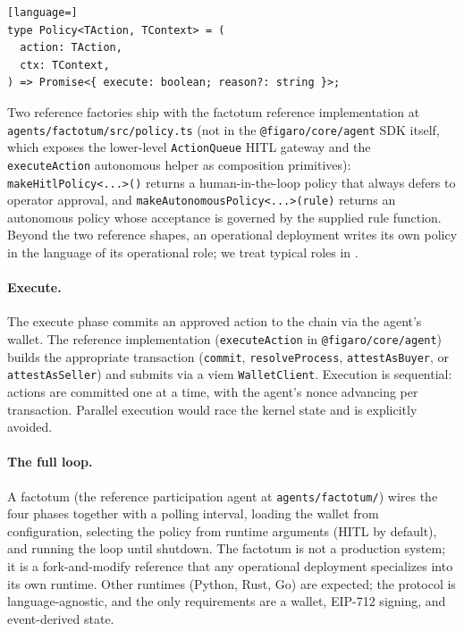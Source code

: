 \documentclass[11pt,a4paper]{article}
\theoremstyle{definition}
\theoremstyle{remark}
\begin{document}
\begin{lstlisting}[language=]
type Policy<TAction, TContext> = (
  action: TAction,
  ctx: TContext,
) => Promise<{ execute: boolean; reason?: string }>;
\end{lstlisting}

Two reference factories ship with the factotum reference
implementation at \texttt{agents/factotum/src/policy.ts} (not in
the \texttt{@figaro/core/agent} SDK itself, which exposes the
lower-level \texttt{ActionQueue} HITL gateway and the
\texttt{executeAction} autonomous helper as composition
primitives): \texttt{makeHitlPolicy<...>()} returns a
human-in-the-loop policy that always defers to operator approval,
and \texttt{makeAutonomousPolicy<...>(rule)} returns an
autonomous policy whose acceptance is governed by the supplied
rule function. Beyond the two reference shapes, an operational
deployment writes its own policy in the language of its
operational role; we treat typical roles in
.

\paragraph{Execute.}
The execute phase commits an approved action to the chain via the
agent's wallet. The reference implementation
(\texttt{executeAction} in \texttt{@figaro/core/agent}) builds
the appropriate transaction (\texttt{commit},
\texttt{resolveProcess}, \texttt{attestAsBuyer}, or
\texttt{attestAsSeller}) and submits via a viem
\texttt{WalletClient}. Execution is sequential: actions are
committed one at a time, with the agent's nonce advancing per
transaction. Parallel execution would race the kernel state and
is explicitly avoided.

\paragraph{The full loop.}
A factotum (the reference participation agent at
\texttt{agents/factotum/}) wires the four phases together with a
polling interval, loading the wallet from configuration,
selecting the policy from runtime arguments (HITL by default),
and running the loop until shutdown. The factotum is not a
production system; it is a fork-and-modify reference that any
operational deployment specializes into its own runtime. Other
runtimes (Python, Rust, Go) are expected; the protocol is
language-agnostic, and the only requirements are a wallet,
EIP-712 signing, and event-derived state.
\end{document}
